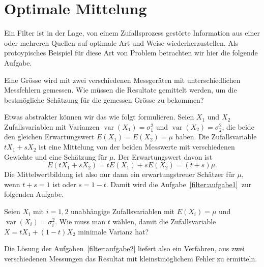 %
%
%
\section{Optimale Mittelung
\label{section:optimale-mittelung}}
Ein Filter ist in der Lage, von einem Zufallsprozess gestörte Information 
aus einer oder mehreren Quellen auf optimale Art und Weise wiederherzustellen.
Als protoypisches Beispiel für diese Art von Problem betrachten wir hier
die folgende Aufgabe.

\begin{aufgabe}
\label{filter:aufgabe1}
Eine Grösse wird mit zwei verschiedenen Messgeräten mit unterschiedlichen
Messfehlern gemessen.
Wie müssen die Resultate gemittelt werden, um die bestmögliche Schätzung
für die gemessen Grösse zu bekommen?
\end{aufgabe}

Etwas abstrakter können wir das wie folgt formulieren.
Seien $X_1$ und $X_2$ Zufallsvariablen mit Varianzen
$\operatorname{var}(X_1)=\sigma_1^2$ und
$\operatorname{var}(X_2)=\sigma_2^2$, die beide den gleichen Erwartungswert
$E(X_1)=E(X_2)=\mu$ haben.
Die Zufallsvariable $tX_1 + sX_2$ ist eine Mittelung von der beiden
Messwerte mit verschiedenen Gewichte und eine Schätzung für $\mu$.
Der Erwartungswert davon ist
\[
E(tX_1+sX_2)
=
tE(X_1) + sE(X_2)
=
(t+s)\mu.
\]
Die Mittelwertbildung ist also nur dann ein erwartungstreuer Schätzer
für $\mu$, wenn $t+s=1$ ist oder $s=1-t$.
Damit wird die Aufgabe~\ref{filter:aufgabe1} zur folgenden Aufgabe.

\begin{aufgabe}
\label{filter:aufgabe2}
Seien $X_i$ mit $i=1,2$ unabhängige Zufallsvariablen mit $E(X_i)=\mu$
und $\operatorname{var}(X_i)=\sigma_i^2$.
Wie muss man $t$ wählen, damit die Zufallsvariable $X=tX_1 +(1-t)X_2$
minimale Varianz hat?
\end{aufgabe}

Die Lösung der Aufgaben~\ref{filter:aufgabe2} liefert also ein Verfahren,
aus zwei verschiedenen Messungen das Resultat mit kleinstmöglichem
Fehler zu ermitteln.

